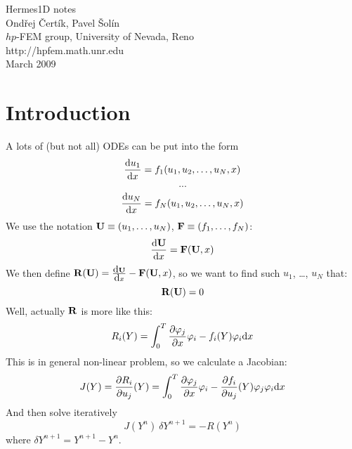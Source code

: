 \documentclass[12pt]{article}
\def\d{\mbox{d}}
\begin{document}
\begin{center}
{\huge Hermes1D notes}\\
\vspace{0.6cm}
Ondřej Čertík, Pavel Šolín\\
$hp$-FEM group, University of Nevada, Reno\\
http://hpfem.math.unr.edu\\
March 2009
\end{center}
\begin{abstract}
Some notes to our Hermes 1D code.
\end{abstract}

\section{Introduction}

A lots of (but not all) ODEs can be put into the form
$$
{\d u_1\over\d x}=f_1(u_1, u_2, \dots, u_N, x)
$$
$$
...
$$
$$
{\d u_N\over\d x}=f_N(u_1, u_2, \dots, u_N, x)
$$
We use the notation ${\bf U}\equiv(u_1,\dots,u_N)$, ${\bf
F}\equiv(f_1,\dots,f_N)$:
$${\d {\bf U}\over\d x}={\bf F}({\bf U}, x)$$
We then define ${\bf R}({\bf U})={\d {\bf U}\over\d x}-{\bf F}({\bf U}, x)$, so
we want to find such $u_1$, \dots, $u_N$ that:
$${\bf R}({\bf U})=0$$
Well, actually ${\bf R}$ is more like this:
$$R_i(Y)=\int_0^T{\partial\varphi_j\over\partial x}\varphi_i-
f_i(Y)\varphi_i\d x
$$
This is in general non-linear problem, so we calculate a Jacobian:
$$J(Y)={\partial R_i\over\partial u_j}(Y)=\int_0^T{\partial\varphi_j\over\partial x}\varphi_i-
{\partial f_i\over \partial u_j}(Y)\varphi_j\varphi_i\d x
$$
And then solve iteratively
$$J(Y^n)\ \delta Y^{n+1}=-R(Y^n)$$
where $\delta Y^{n+1} = Y^{n+1}-Y^{n}$.
\end{document}

